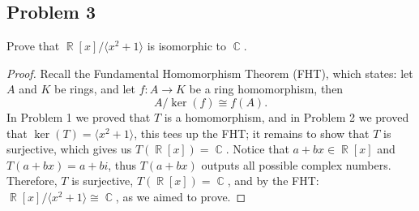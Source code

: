 \documentclass[letterpaper, 12pt]{amsart}
\DeclareMathOperator{\R}{\mathbb{R}}
\DeclareMathOperator{\C}{\mathbb{C}}
\newcommand{\pid}[1]{\langle #1 \rangle}
\begin{document}
		\subsection*{Problem 3}
		\label{sub:problem_3}
		Prove that $\R[x]/\pid{x^{2} + 1}$ is isomorphic to $\C$.
			\begin{proof}
			Recall the Fundamental Homomorphism Theorem (FHT), which states: let $A$ and $K$ be rings, and let $f: A \to K$ be a ring homomorphism, then $$A/\ker{(f)} \cong f(A).$$
			In Problem 1 we proved that $T$ is a homomorphism, and in Problem 2 we proved that $\ker{(T)} = \pid{x^{2}+1}$, this tees up the FHT; it remains to show that $T$ is surjective, which gives us $T(\R[x]) = \C$.
			Notice that $a + bx \in \R[x]$ and $T(a+bx) = a+bi$, thus $T(a+bx)$ outputs all possible complex numbers.
			Therefore, $T$ is surjective, $T(\R[x]) = \C$, and by the FHT: $\R[x]/\pid{x^{2} + 1} \cong \C$, as we aimed to prove.
			\end{proof}
\end{document}
